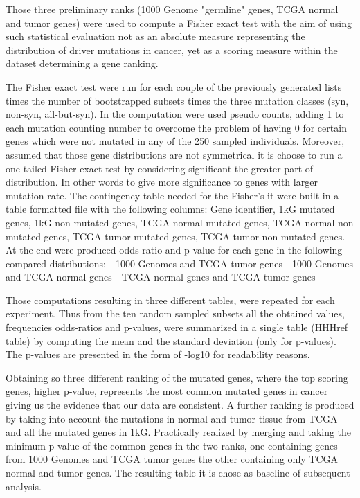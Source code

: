 Those three preliminary ranks (1000 Genome "germline" genes, TCGA normal and tumor genes) were used to compute a Fisher exact test with the aim of using such statistical evaluation not as an absolute measure representing the distribution of driver mutations in cancer, yet as a scoring measure within the dataset determining a gene ranking. 


The Fisher exact test were run for each couple of the previously generated lists times the number of bootstrapped subsets times the three mutation classes (syn, non-syn, all-but-syn). In the computation were used pseudo counts, adding 1 to each mutation counting number to overcome the problem of having 0 for certain genes which were not mutated in any of the 250 sampled individuals. Moreover, assumed that those gene distributions are not symmetrical it is choose to run a one-tailed Fisher exact test by considering significant the greater part of distribution. In other words to give more significance to genes with larger mutation rate. The contingency table needed for the Fisher's it were built in a table formatted file with the following columns: Gene identifier, 1kG mutated genes, 1kG non mutated genes, TCGA normal mutated genes, TCGA normal non mutated genes, TCGA tumor mutated genes, TCGA tumor non mutated genes. At the end were produced odds ratio and p-value for each gene in the following compared distributions:
- 1000 Genomes and TCGA tumor genes
- 1000 Genomes and TCGA normal genes
- TCGA normal genes and TCGA tumor genes


Those computations resulting in three different tables, were repeated for each experiment. Thus from the ten random sampled subsets all the obtained values, frequencies odds-ratios and p-values, were summarized in a single table (HHHref table) by computing the mean and the standard deviation (only for p-values). The p-values are presented in the form of -log10 for readability reasons.


Obtaining so three different ranking of the mutated genes, where the top scoring genes, higher p-value, represents the most common mutated genes in cancer giving us the evidence that our data are consistent. 
A further ranking is produced by taking into account the mutations in normal and tumor tissue from TCGA and all the mutated genes in 1kG. Practically realized by merging and taking the minimum p-value of the common genes in the two ranks, one containing genes from 1000 Genomes and TCGA tumor genes the other containing only TCGA normal and tumor genes. The resulting table it is chose as baseline of subsequent analysis. 



